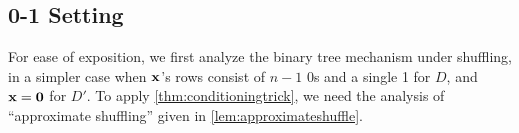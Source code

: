 





\subsection{0-1 Setting}

For ease of exposition, we first analyze the binary tree mechanism under shuffling, in a simpler case when $\mathbf{x}$'s rows consist of $n-1$ 0s and a single 1 for $D$, and $\mathbf{x} = \boldsymbol{0}$ for $D'$. 
To apply \cref{thm:conditioningtrick}, we need the analysis of ``approximate shuffling'' given in \cref{lem:approximateshuffle}.

